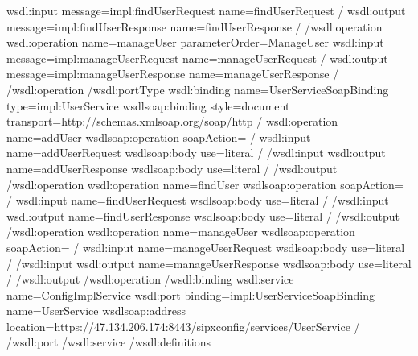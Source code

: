 \documentclass[letterpaper,10pt,english]{sphinxmanual}
\begin{document}
\begin{sphinxVerbatim}[commandchars=\\\{\}]
\PYGZlt{}wsdl:input message=\PYGZdq{}impl:findUserRequest\PYGZdq{} name=\PYGZdq{}findUserRequest\PYGZdq{} /\PYGZgt{}
\PYGZlt{}wsdl:output message=\PYGZdq{}impl:findUserResponse\PYGZdq{} name=\PYGZdq{}findUserResponse\PYGZdq{} /\PYGZgt{}
\PYGZlt{}/wsdl:operation\PYGZgt{}
\PYGZlt{}wsdl:operation name=\PYGZdq{}manageUser\PYGZdq{} parameterOrder=\PYGZdq{}ManageUser\PYGZdq{}\PYGZgt{}
\PYGZlt{}wsdl:input message=\PYGZdq{}impl:manageUserRequest\PYGZdq{} name=\PYGZdq{}manageUserRequest\PYGZdq{} /\PYGZgt{}
\PYGZlt{}wsdl:output message=\PYGZdq{}impl:manageUserResponse\PYGZdq{} name=\PYGZdq{}manageUserResponse\PYGZdq{} /\PYGZgt{}
\PYGZlt{}/wsdl:operation\PYGZgt{}
\PYGZlt{}/wsdl:portType\PYGZgt{}
\PYGZlt{}wsdl:binding name=\PYGZdq{}UserServiceSoapBinding\PYGZdq{} type=\PYGZdq{}impl:UserService\PYGZdq{}\PYGZgt{}
\PYGZlt{}wsdlsoap:binding style=\PYGZdq{}document\PYGZdq{} transport=\PYGZdq{}http://schemas.xmlsoap.org/soap/http\PYGZdq{} /\PYGZgt{}
\PYGZlt{}wsdl:operation name=\PYGZdq{}addUser\PYGZdq{}\PYGZgt{}
\PYGZlt{}wsdlsoap:operation soapAction=\PYGZdq{}\PYGZdq{} /\PYGZgt{}
\PYGZlt{}wsdl:input name=\PYGZdq{}addUserRequest\PYGZdq{}\PYGZgt{}
\PYGZlt{}wsdlsoap:body use=\PYGZdq{}literal\PYGZdq{} /\PYGZgt{}
\PYGZlt{}/wsdl:input\PYGZgt{}
\PYGZlt{}wsdl:output name=\PYGZdq{}addUserResponse\PYGZdq{}\PYGZgt{}
\PYGZlt{}wsdlsoap:body use=\PYGZdq{}literal\PYGZdq{} /\PYGZgt{}
\PYGZlt{}/wsdl:output\PYGZgt{}
\PYGZlt{}/wsdl:operation\PYGZgt{}
\PYGZlt{}wsdl:operation name=\PYGZdq{}findUser\PYGZdq{}\PYGZgt{}
\PYGZlt{}wsdlsoap:operation soapAction=\PYGZdq{}\PYGZdq{} /\PYGZgt{}
\PYGZlt{}wsdl:input name=\PYGZdq{}findUserRequest\PYGZdq{}\PYGZgt{}
\PYGZlt{}wsdlsoap:body use=\PYGZdq{}literal\PYGZdq{} /\PYGZgt{}
\PYGZlt{}/wsdl:input\PYGZgt{}
\PYGZlt{}wsdl:output name=\PYGZdq{}findUserResponse\PYGZdq{}\PYGZgt{}
\PYGZlt{}wsdlsoap:body use=\PYGZdq{}literal\PYGZdq{} /\PYGZgt{}
\PYGZlt{}/wsdl:output\PYGZgt{}
\PYGZlt{}/wsdl:operation\PYGZgt{}
\PYGZlt{}wsdl:operation name=\PYGZdq{}manageUser\PYGZdq{}\PYGZgt{}
\PYGZlt{}wsdlsoap:operation soapAction=\PYGZdq{}\PYGZdq{} /\PYGZgt{}
\PYGZlt{}wsdl:input name=\PYGZdq{}manageUserRequest\PYGZdq{}\PYGZgt{}
\PYGZlt{}wsdlsoap:body use=\PYGZdq{}literal\PYGZdq{} /\PYGZgt{}
\PYGZlt{}/wsdl:input\PYGZgt{}
\PYGZlt{}wsdl:output name=\PYGZdq{}manageUserResponse\PYGZdq{}\PYGZgt{}
\PYGZlt{}wsdlsoap:body use=\PYGZdq{}literal\PYGZdq{} /\PYGZgt{}
\PYGZlt{}/wsdl:output\PYGZgt{}
\PYGZlt{}/wsdl:operation\PYGZgt{}
\PYGZlt{}/wsdl:binding\PYGZgt{}
\PYGZlt{}wsdl:service name=\PYGZdq{}ConfigImplService\PYGZdq{}\PYGZgt{}
\PYGZlt{}wsdl:port binding=\PYGZdq{}impl:UserServiceSoapBinding\PYGZdq{} name=\PYGZdq{}UserService\PYGZdq{}\PYGZgt{}
\PYGZlt{}wsdlsoap:address location=\PYGZdq{}https://47.134.206.174:8443/sipxconfig/services/UserService\PYGZdq{} /\PYGZgt{}
\PYGZlt{}/wsdl:port\PYGZgt{}
\PYGZlt{}/wsdl:service\PYGZgt{}
\PYGZlt{}/wsdl:definitions\PYGZgt{}
\end{sphinxVerbatim}
\end{document}
